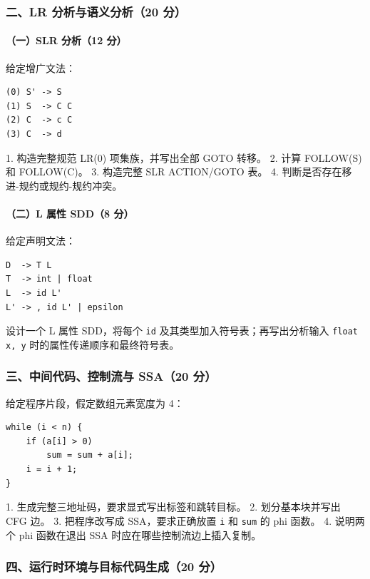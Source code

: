 \documentclass[UTF8]{ctexart}
\begin{document}
\subsubsection*{二、LR 分析与语义分析（20 分）}

\paragraph*{（一）SLR 分析（12 分）}

给定增广文法：

\begin{Verbatim}[fontsize=\small,breaklines=true]
(0) S' -> S
(1) S  -> C C
(2) C  -> c C
(3) C  -> d
\end{Verbatim}

1. 构造完整规范 LR(0) 项集族，并写出全部 GOTO 转移。 2. 计算 FOLLOW(S) 和 FOLLOW(C)。 3. 构造完整 SLR ACTION/GOTO 表。 4. 判断是否存在移进-规约或规约-规约冲突。

\paragraph*{（二）L 属性 SDD（8 分）}

给定声明文法：

\begin{Verbatim}[fontsize=\small,breaklines=true]
D  -> T L
T  -> int | float
L  -> id L'
L' -> , id L' | epsilon
\end{Verbatim}

设计一个 L 属性 SDD，将每个 \texttt{id} 及其类型加入符号表；再写出分析输入 \texttt{float x, y} 时的属性传递顺序和最终符号表。

\subsubsection*{三、中间代码、控制流与 SSA（20 分）}

给定程序片段，假定数组元素宽度为 4：

\begin{Verbatim}[fontsize=\small,breaklines=true]
while (i < n) {
    if (a[i] > 0)
        sum = sum + a[i];
    i = i + 1;
}
\end{Verbatim}

1. 生成完整三地址码，要求显式写出标签和跳转目标。 2. 划分基本块并写出 CFG 边。 3. 把程序改写成 SSA，要求正确放置 \texttt{i} 和 \texttt{sum} 的 phi 函数。 4. 说明两个 phi 函数在退出 SSA 时应在哪些控制流边上插入复制。

\subsubsection*{四、运行时环境与目标代码生成（20 分）}
\end{document}
